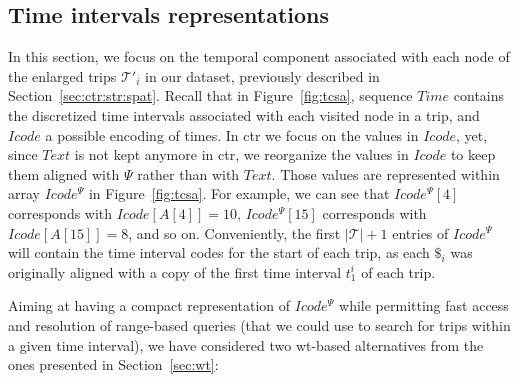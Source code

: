	\subsection{Time intervals representations}
	\label{sec:ctr:str:temp}

	In this section, we focus on the temporal component associated with each node of the enlarged trips $\mathcal{T}'_i$ 
	in our dataset, previously described in Section~\ref{sec:ctr:str:spat}. Recall that in Figure~\ref{fig:tcsa}, sequence $Time$ contains the discretized time intervals
	associated with each visited node in a trip, and $Icode$ a possible encoding of times.
	In \gls{ctr} we focus on the values in $Icode$, yet, since $Text$ is not kept anymore in \gls{ctr}, we 
	reorganize the values in $Icode$ to keep them aligned with $\Psi$ rather than with $Text$. Those
	values are represented within array $Icode^{\Psi}$ in Figure~\ref{fig:tcsa}. 
	For example, we can see that $Icode^{\Psi}[4]$ corresponds with $Icode[A[4]]=10$, 
	$Icode^{\Psi}[15]$ corresponds with $Icode[A[15]]=8$, and so on. Conveniently, the first $|\mathcal{T}| + 1$ entries of $Icode^{\Psi}$ will contain the time interval codes for the start of each trip, as each $\$_i$ was originally aligned with a copy of the first time interval $t^i_1$ of each trip.

	Aiming at having a compact representation of $Icode^{\Psi}$ while permitting fast 
	access and resolution of range-based queries (that we could use to search for trips within 
	a given time interval), we have considered two \gls{wt}-based alternatives from the ones presented in Section~\ref{sec:wt}:

